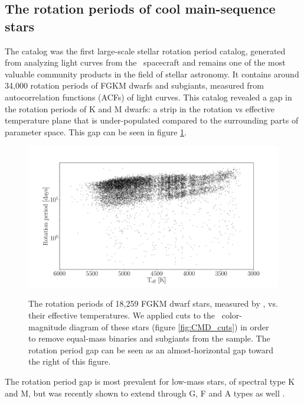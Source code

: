 \subsection{The rotation periods of cool main-sequence stars}

The \citet{mcquillan2014} catalog was the first large-scale stellar rotation
period catalog, generated from analyzing light curves from the \kepler\
spacecraft and remains one of the most valuable community products in the
field of stellar astronomy.
It contains around 34,000 rotation periods of FGKM dwarfs and subgiants,
measured from autocorrelation functions (ACFs) of light curves.
This catalog revealed a gap in the rotation periods of K and M dwarfs: a strip
in the rotation vs effective temperature plane that is under-populated
compared to the surrounding parts of parameter space.
This gap can be seen in figure \ref{fig:the_gap}.
\begin{figure}
  \caption{
The rotation periods of 18,259 FGKM dwarf stars, measured by \mct, vs. their
effective temperatures.
We applied cuts to the \gaia\ color-magnitude diagram of these stars (figure
\ref{fig:CMD_cuts}) in order to remove equal-mass binaries and subgiants from
the sample.
The rotation period gap can be seen as an almost-horizontal gap toward the
right of this figure.
}
  \centering
    \includegraphics[width=1\textwidth]{the_gap}
\label{fig:the_gap}
\end{figure}
The rotation period gap is most prevalent for low-mass stars, of spectral type
K and M, but was recently shown to extend through G, F and A types as well
\citep{davenport2017}.

